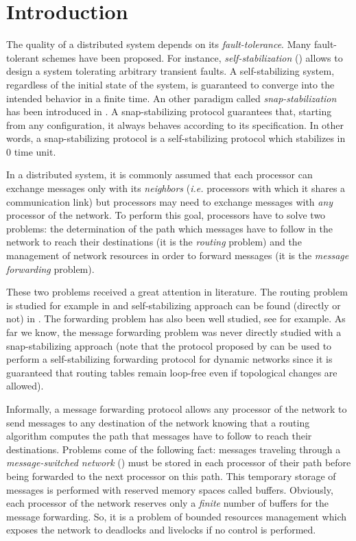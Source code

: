 \documentclass[11pt]{article}
\begin{document}
\newpage

\section{Introduction}

The quality of a distributed system depends on its \emph{fault-tolerance}. Many fault-tolerant schemes have been proposed. For instance, \emph{self-stabilization} (\cite{D74}) allows to design a system tolerating arbitrary transient faults. A self-stabilizing system, regardless of the initial state of the system, is guaranteed to converge into the intended behavior in a finite time. An other paradigm called \emph{snap-stabilization} has been introduced in \cite{BDPV07,BDPV99}. A snap-stabilizing protocol guarantees that, starting from any configuration, it always behaves according to its specification. In other words, a snap-stabilizing protocol is a self-stabilizing protocol which stabilizes in 0 time unit.

In a distributed system, it is commonly assumed that each processor can exchange messages only with its \emph{neighbors} (\emph{i.e.} processors with which it shares a communication link) but processors may need to exchange messages with \emph{any} processor of the network. To perform this goal, processors have to solve two problems: the determination of the path which messages have to follow in the network to reach their destinations (it is the \emph{routing} problem) and the management of network resources in order to forward messages (it is the \emph{message forwarding} problem).

These two problems received a great attention in literature. The routing problem is studied for example in \cite{BLT93,CM82,FG97,FG98,G00,LT87,LT94,MS79,T77,T80b} and self-stabilizing approach can be found (directly or not) in \cite{HC92,KK05,D97,JT03}. The forwarding problem has also been well studied, see \cite{D96,MS78,SJ95,T80,TS81,TU81} for example. As far we know, the message forwarding problem was never directly studied with a snap-stabilizing approach (note that the protocol proposed by \cite{JT03} can be used to perform a self-stabilizing forwarding protocol for dynamic networks since it is guaranteed that routing tables remain loop-free even if topological changes are allowed).

Informally, a message forwarding protocol allows any processor of the network to send messages to any destination of the network knowing that a routing algorithm computes the path that messages have to follow to reach their destinations. Problems come of the following fact: messages traveling through a \emph{message-switched network} (\cite{T01}) must be stored in each processor of their path before being forwarded to the next processor on this path. This temporary storage of messages is performed with reserved memory spaces called buffers. Obviously, each processor of the network reserves only a \emph{finite} number of buffers for the message forwarding. So, it is a problem of bounded resources management which exposes the network to deadlocks and livelocks if no control is performed. 
\end{document}

